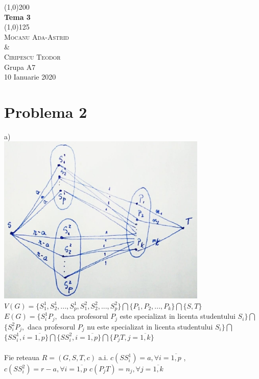 \documentclass{article}
\begin{document}
\begin{titlepage}
	\begin{center}
	\line(1,0){200} \\
	[0.25 in]
	\huge{\bfseries Tema 3} \\
	[2mm]
	\line(1,0){125}\\
	[1.5cm]
	\textsc{\LARGE Mocanu Ada-Astrid\\ \& \\Ciripescu Teodor}\\
	[5mm]
	Grupa A7\\
	[10mm]
	\LARGE 10 Ianuarie 2020\\
	\end{center}
\end{titlepage}



\newpage
\section*{Problema 2}
\Large
a) \\
\includegraphics[width=100mm,scale=1]{2.jpg}\\
$V(G)=\{ S_1^1,S_2^1,...,S_p^1, S_1^2, S_2^2, ...,S_p^2\}\bigcap \{ P_1,P_2,...,P_k\} \bigcap \{ S,T\}$\\
$E(G)=\{S_i^1 P_j,$ daca profesorul $P_j$ este specializat in licenta studentului $S_i\} \bigcap$$\{S_i^2 P_j,$ daca profesorul $P_j$ nu este specializat in licenta studentului $S_i\} \bigcap$$\{SS_i^1, i=\overline{1,p}\}\bigcap$$\{SS_i^2, i=\overline{1,p}\}\bigcap$$\{P_jT, j=\overline{1,k}\}$\\
\bigskip\\
Fie reteaua $R=(G,S,T,c)$ a.i. $c(SS_i^1)=a,\forall i=\overline{1,p}$ , $c(SS_i^2)=r-a,\forall i=\overline{1,p}$ $c(P_jT)=n_j,\forall j=\overline{1,k}$ \\
\end{document}
